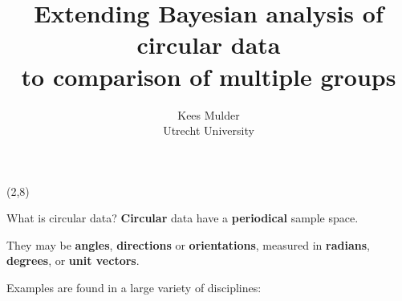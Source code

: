 \documentclass[final]{beamer}
\title{{\LARGE Extending Bayesian analysis of circular data \\ to comparison of multiple groups}}
\author{{\large Kees Mulder} \\ {  \normalsize  Utrecht University }}
\begin{document}
\begin{frame} 

%
\begin{textblock}{55}(2,8)


\begin{block}{\centering What is circular data?}
\textbf{Circular} data have a \textbf{periodical} sample space.

They may be \textbf{angles}, \textbf{directions} or \textbf{orientations}, measured in \textbf{radians}, \textbf{degrees}, or  \textbf{unit vectors}. 


\vspace{1cm}

\begin{minipage}{0.55\textwidth}

Examples are found in a large variety of disciplines:


\end{minipage}
\end{block}
\end{textblock}
\end{frame}
\end{document}
